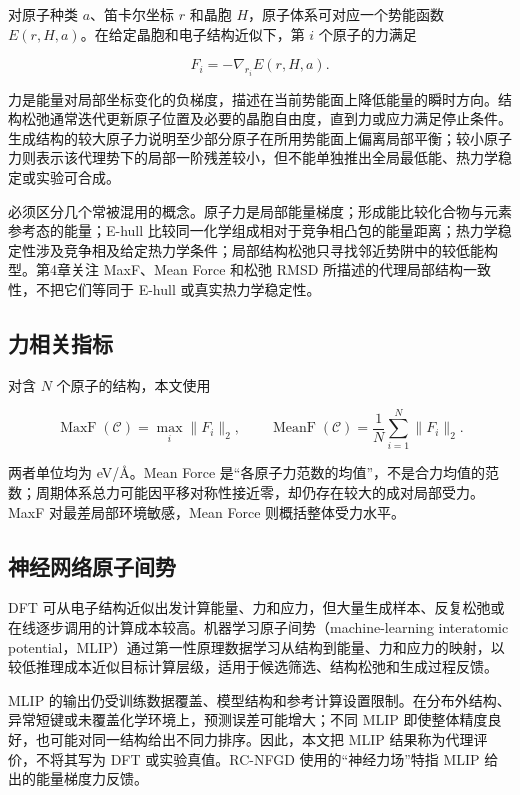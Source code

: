 对原子种类 \(a\)、笛卡尔坐标 \(r\) 和晶胞 \(H\)，原子体系可对应一个势能函数 \(E(r,H,a)\)。在给定晶胞和电子结构近似下，第 \(i\) 个原子的力满足

\[
F_i=-\nabla_{r_i}E(r,H,a).
\tag{2-16}
\]

力是能量对局部坐标变化的负梯度，描述在当前势能面上降低能量的瞬时方向。结构松弛通常迭代更新原子位置及必要的晶胞自由度，直到力或应力满足停止条件。生成结构的较大原子力说明至少部分原子在所用势能面上偏离局部平衡；较小原子力则表示该代理势下的局部一阶残差较小，但不能单独推出全局最低能、热力学稳定或实验可合成。

必须区分几个常被混用的概念。原子力是局部能量梯度；形成能比较化合物与元素参考态的能量；E-hull 比较同一化学组成相对于竞争相凸包的能量距离；热力学稳定性涉及竞争相及给定热力学条件；局部结构松弛只寻找邻近势阱中的较低能构型。第4章关注 MaxF、Mean Force 和松弛 RMSD 所描述的代理局部结构一致性，不把它们等同于 E-hull 或真实热力学稳定性。

\subsection{力相关指标}

对含 \(N\) 个原子的结构，本文使用

\[
\operatorname{MaxF}(\mathcal C)=\max_i\lVert F_i\rVert_2,
\qquad
\operatorname{MeanF}(\mathcal C)=\frac{1}{N}\sum_{i=1}^{N}\lVert F_i\rVert_2.
\tag{2-17}
\]

两者单位均为 eV/Å。Mean Force 是``各原子力范数的均值''，不是合力均值的范数；周期体系总力可能因平移对称性接近零，却仍存在较大的成对局部受力。MaxF 对最差局部环境敏感，Mean Force 则概括整体受力水平。

\subsection{神经网络原子间势}

DFT 可从电子结构近似出发计算能量、力和应力，但大量生成样本、反复松弛或在线逐步调用的计算成本较高。机器学习原子间势（machine-learning interatomic potential，MLIP）通过第一性原理数据学习从结构到能量、力和应力的映射，以较低推理成本近似目标计算层级，适用于候选筛选、结构松弛和生成过程反馈。

MLIP 的输出仍受训练数据覆盖、模型结构和参考计算设置限制。在分布外结构、异常短键或未覆盖化学环境上，预测误差可能增大；不同 MLIP 即使整体精度良好，也可能对同一结构给出不同力排序。因此，本文把 MLIP 结果称为代理评价，不将其写为 DFT 或实验真值。RC-NFGD 使用的``神经力场''特指 MLIP 给出的能量梯度力反馈。

